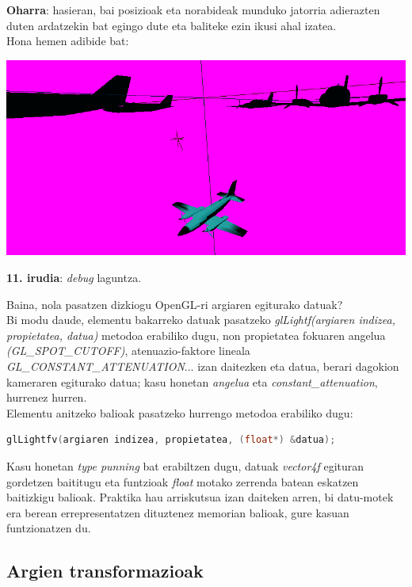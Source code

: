 \documentclass[12pt]{article}
\newcommand{\metodo}[1] {\textit{#1}}
\newcommand{\aldagai}[1] {\textit{#1}}
\begin{document}
\textbf{Oharra}: hasieran, bai posizioak eta norabideak munduko jatorria adierazten duten ardatzekin bat egingo dute eta baliteke ezin ikusi ahal izatea.\\

Hona hemen adibide bat:
\begin{center}
\includegraphics[scale=2.2]{debug.png}

\textbf{11. irudia}: \textit{debug} laguntza.
\end{center}

Baina, nola pasatzen dizkiogu OpenGL-ri argiaren egiturako datuak?\\
Bi modu daude, elementu bakarreko datuak pasatzeko \metodo{glLightf(argiaren indizea, propietatea, datua)} metodoa erabiliko dugu, non 
propietatea fokuaren angelua \textit{(GL\_SPOT\_CUTOFF)}, atenuazio-faktore lineala \textit{GL\_CONSTANT\_ATTENUATION}... izan daitezken eta datua, berari dagokion kameraren egiturako datua; kasu honetan \aldagai{angelua} eta \aldagai{constant\_attenuation}, hurrenez hurren.\\

Elementu anitzeko balioak pasatzeko hurrengo metodoa erabiliko dugu:
\begin{lstlisting}[language=C]
glLightfv(argiaren indizea, propietatea, (float*) &datua);
\end{lstlisting}
Kasu honetan \textit{type punning}\cite{punning} bat erabiltzen dugu, datuak \aldagai{vector4f} egituran gordetzen baititugu eta funtzioak \aldagai{float} motako zerrenda batean eskatzen baitizkigu balioak. Praktika hau arriskutsua izan daiteken arren, bi datu-motek era berean errepresentatzen dituztenez memorian balioak, gure kasuan funtzionatzen du.

\subsection{Argien transformazioak}
\end{document}
